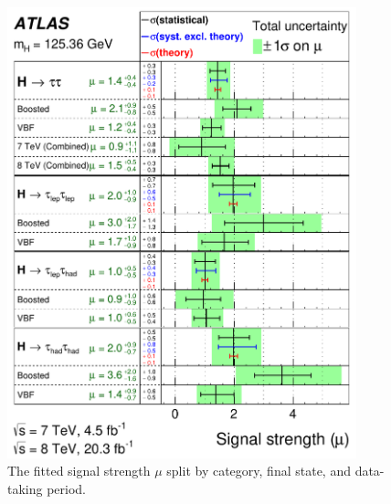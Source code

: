 \begin{figure}[tp]
  \centering
  \includegraphics[width=0.90\textwidth]{figures/HIGG-2013-32/fig_09}
  \caption{The fitted signal strength $\mu$ split by category, final state, and data-taking period.}
  \label{fig:results-musummary}
\end{figure}


